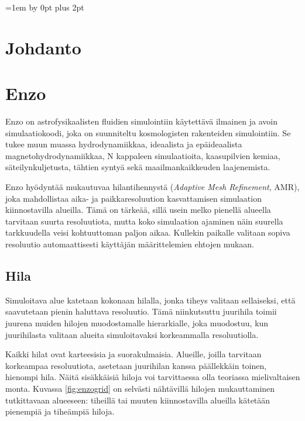 \documentclass[12pt,a4paper]{article}
\begin{document}
\newpage
\thispagestyle{empty}
\tableofcontents
\newpage
\setcounter{page}{1}
\parskip=1em \advance\parskip by 0pt plus 2pt
\pagestyle{fancy}
\cfoot{\thepage}

\section{Johdanto}

\section{Enzo}
Enzo on astrofysikaalisten fluidien simulointiin käytettävä ilmainen ja avoin simulaatiokoodi, joka on suunniteltu kosmologisten rakenteiden simulointiin. Se tukee muun muassa hydrodynamiikkaa, ideaalista ja epäideaalista magnetohydrodynamiikkaa, N kappaleen simulaatioita, kaasupilvien kemiaa, säteilynkuljetusta, tähtien syntyä sekä maailmankaikkeuden laajenemista. \cite{enzo} %

Enzo hyödyntää mukautuvaa hilantihennystä (\textit{Adaptive Mesh Refinement}, AMR), joka mahdollistaa aika- ja paikkaresoluution kasvattamisen simulaation kiinnostavilla alueilla. Tämä on tärkeää, sillä usein melko pienellä alueella tarvitaan suurta resoluutiota, mutta koko simulaation ajaminen näin suurella tarkkuudella veisi kohtuuttoman paljon aikaa. Kullekin paikalle valitaan sopiva resoluutio automaattisesti käyttäjän määrittelemien ehtojen mukaan. \cite{enzo}

\subsection{Hila}
Simuloitava alue katetaan kokonaan hilalla, jonka tiheys valitaan sellaiseksi, että saavutetaan pienin haluttava resoluutio. Tämä niinkutsuttu juurihila toimii juurena muiden hilojen muodostamalle hierarkialle, joka muodostuu, kun juurihilasta valitaan alueita simuloitavaksi korkeammalla resoluutiolla.\cite{enzo}
	
Kaikki hilat ovat karteesisia ja suorakulmaisia. Alueille, joilla tarvitaan korkeampaa resoluutiota, asetetaan juurihilan kanssa päällekkäin toinen, hienompi hila. Näitä sisäkkäisiä hiloja voi tarvittaessa olla teoriassa mielivaltaisen monta. Kuvassa \ref{fig:enzogrid} on selvästi nähtävillä hilojen mukauttaminen tutkittavaan alueeseen: tiheillä tai muuten kiinnostavilla alueilla kätetään pienempiä ja tiheämpiä hiloja. \cite{enzo} %
\end{document}
